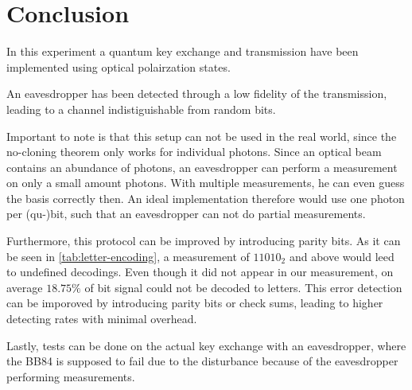 \section{Conclusion}
\label{sec:conclusion}
In this experiment a quantum key exchange and transmission have been implemented using optical
polairzation states.

An eavesdropper has been detected through a low fidelity of the transmission, leading to a channel
indistiguishable from random bits.

Important to note is that this setup can not be used in the real world, since the no-cloning
theorem only works for individual photons. Since an optical beam contains an abundance of photons,
an eavesdropper can perform a measurement on only a small amount photons. With multiple
measurements, he can even guess the basis correctly then. An ideal implementation therefore would
use one photon per (qu-)bit, such that an eavesdropper can not do partial measurements.

Furthermore, this protocol can be improved by introducing parity bits. As it can be seen in
\autoref{tab:letter-encoding}, a measurement of $11010_2$ and above would leed to undefined
decodings. Even though it did not appear in our measurement, on average $18.75\%$ of bit signal
could not be decoded to letters. This error detection can be imporoved by introducing parity bits or
check sums, leading to higher detecting rates with minimal overhead.

Lastly, tests can be done on the actual key exchange with an eavesdropper, 
where the BB84 is supposed to fail due to the disturbance because of the eavesdropper performing
measurements.

